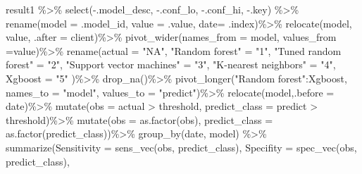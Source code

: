 \documentclass[
]{article}
\newenvironment{Shaded}{\begin{snugshade}}{\end{snugshade}}
\newcommand{\AttributeTok}[1]{\textcolor[rgb]{0.77,0.63,0.00}{#1}}
\newcommand{\FunctionTok}[1]{\textcolor[rgb]{0.00,0.00,0.00}{#1}}
\newcommand{\NormalTok}[1]{#1}
\newcommand{\OtherTok}[1]{\textcolor[rgb]{0.56,0.35,0.01}{#1}}
\newcommand{\SpecialCharTok}[1]{\textcolor[rgb]{0.00,0.00,0.00}{#1}}
\newcommand{\StringTok}[1]{\textcolor[rgb]{0.31,0.60,0.02}{#1}}
\begin{document}
\begin{Shaded}
\begin{Highlighting}[]
\NormalTok{result1 }\SpecialCharTok{\%\textgreater{}\%}
  \FunctionTok{select}\NormalTok{(}\SpecialCharTok{{-}}\NormalTok{.model\_desc, }\SpecialCharTok{{-}}\NormalTok{.conf\_lo, }\SpecialCharTok{{-}}\NormalTok{.conf\_hi, }\SpecialCharTok{{-}}\NormalTok{.key) }\SpecialCharTok{\%\textgreater{}\%}
  \FunctionTok{rename}\NormalTok{(}\AttributeTok{model =}\NormalTok{ .model\_id, }\AttributeTok{value =}\NormalTok{ .value, }\AttributeTok{date=}\NormalTok{ .index)}\SpecialCharTok{\%\textgreater{}\%}
  \FunctionTok{relocate}\NormalTok{(model, value, }\AttributeTok{.after =}\NormalTok{ client)}\SpecialCharTok{\%\textgreater{}\%}
  \FunctionTok{pivot\_wider}\NormalTok{(}\AttributeTok{names\_from =}\NormalTok{ model, }\AttributeTok{values\_from =}\NormalTok{value)}\SpecialCharTok{\%\textgreater{}\%}
  \FunctionTok{rename}\NormalTok{(}\AttributeTok{actual =} \StringTok{"NA"}\NormalTok{, }\StringTok{"Random forest"} \OtherTok{=} \StringTok{"1"}\NormalTok{, }\StringTok{"Tuned random forest"} \OtherTok{=} \StringTok{"2"}\NormalTok{, }
      \StringTok{"Support vector machines"} \OtherTok{=} \StringTok{"3"}\NormalTok{, }\StringTok{"K{-}nearest neighbors"} \OtherTok{=} \StringTok{"4"}\NormalTok{, }\AttributeTok{Xgboost =} \StringTok{"5"}\NormalTok{ )}\SpecialCharTok{\%\textgreater{}\%}
  \FunctionTok{drop\_na}\NormalTok{()}\SpecialCharTok{\%\textgreater{}\%}
  \FunctionTok{pivot\_longer}\NormalTok{(}\StringTok{"Random forest"}\SpecialCharTok{:}\NormalTok{Xgboost, }\AttributeTok{names\_to =} \StringTok{"model"}\NormalTok{, }\AttributeTok{values\_to =} \StringTok{"predict"}\NormalTok{)}\SpecialCharTok{\%\textgreater{}\%}
  \FunctionTok{relocate}\NormalTok{(model,}\AttributeTok{.before =}\NormalTok{ date)}\SpecialCharTok{\%\textgreater{}\%}
  \FunctionTok{mutate}\NormalTok{(}\AttributeTok{obs =}\NormalTok{ actual }\SpecialCharTok{\textgreater{}}\NormalTok{ threshold, }\AttributeTok{predict\_class =}\NormalTok{ predict }\SpecialCharTok{\textgreater{}}\NormalTok{ threshold)}\SpecialCharTok{\%\textgreater{}\%}
  \FunctionTok{mutate}\NormalTok{(}\AttributeTok{obs =} \FunctionTok{as.factor}\NormalTok{(obs), }\AttributeTok{predict\_class =} \FunctionTok{as.factor}\NormalTok{(predict\_class))}\SpecialCharTok{\%\textgreater{}\%}
  \FunctionTok{group\_by}\NormalTok{(date, model) }\SpecialCharTok{\%\textgreater{}\%}
  \FunctionTok{summarize}\NormalTok{(}\AttributeTok{Sensitivity =} \FunctionTok{sens\_vec}\NormalTok{(obs, predict\_class),}
            \AttributeTok{Specifity =} \FunctionTok{spec\_vec}\NormalTok{(obs, predict\_class),}

\end{Highlighting}
\end{Shaded}
\end{document}
